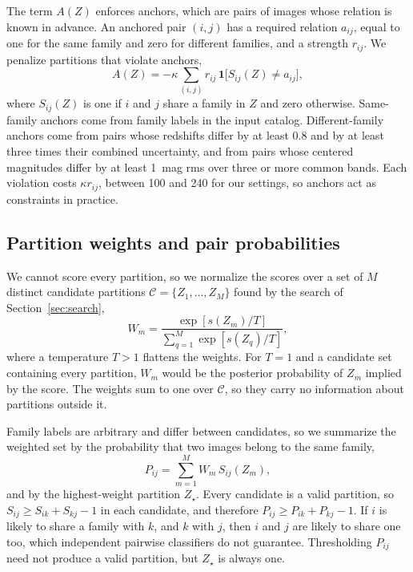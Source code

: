 \documentclass[twocolumn,twocolappendix,linenumbers]{aastex701}
\newcommand{\ind}{\mathbf{1}}
\begin{document}
The term $A(Z)$ enforces anchors, which are pairs of images whose relation is known in advance.
An anchored pair $(i,j)$ has a required relation $a_{ij}$, equal to one for the same family and zero for different families, and a strength $r_{ij}$.
We penalize partitions that violate anchors,
\begin{equation}
A(Z)=-\kappa\sum_{(i,j)}r_{ij}\,\ind\big[S_{ij}(Z)\ne a_{ij}\big],
\label{eq:anchors}
\end{equation}
where $S_{ij}(Z)$ is one if $i$ and $j$ share a family in $Z$ and zero otherwise.
Same-family anchors come from family labels in the input catalog.
Different-family anchors come from pairs whose redshifts differ by at least 0.8 and by at least three times their combined uncertainty, and from pairs whose centered magnitudes differ by at least 1~mag rms over three or more common bands.
Each violation costs $\kappa r_{ij}$, between 100 and 240 for our settings, so anchors act as constraints in practice.

\subsection{Partition weights and pair probabilities}
\label{sec:weights}
We cannot score every partition, so we normalize the scores over a set of $M$ distinct candidate partitions $\mathcal C=\{Z_1,\ldots,Z_M\}$ found by the search of Section~\ref{sec:search},
\begin{equation}
W_m=\frac{\exp[s(Z_m)/T]}{\sum_{q=1}^{M}\exp[s(Z_q)/T]},
\label{eq:weights}
\end{equation}
where a temperature $T>1$ flattens the weights.
For $T=1$ and a candidate set containing every partition, $W_m$ would be the posterior probability of $Z_m$ implied by the score.
The weights sum to one over $\mathcal C$, so they carry no information about partitions outside it.

Family labels are arbitrary and differ between candidates, so we summarize the weighted set by the probability that two images belong to the same family,
\begin{equation}
P_{ij}=\sum_{m=1}^{M}W_m\,S_{ij}(Z_m),
\label{eq:pairprob}
\end{equation}
and by the highest-weight partition $Z_\star$.
Every candidate is a valid partition, so $S_{ij}\ge S_{ik}+S_{kj}-1$ in each candidate, and therefore $P_{ij}\ge P_{ik}+P_{kj}-1$.
If $i$ is likely to share a family with $k$, and $k$ with $j$, then $i$ and $j$ are likely to share one too, which independent pairwise classifiers do not guarantee.
Thresholding $P_{ij}$ need not produce a valid partition, but $Z_\star$ is always one.
\end{document}
